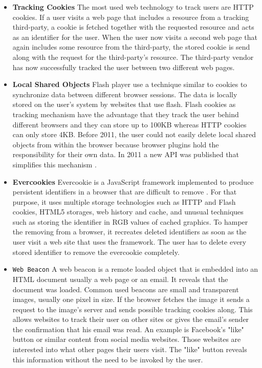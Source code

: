	\begin{itemize}
		\item \textbf{Tracking Cookies} The most used web technology to track users are HTTP cookies. If a user visits a web page that includes a resource from a tracking third-party, a cookie is fetched together with the requested resource and acts as an identifier for the user. When the user now visits a second web page that again includes some resource from the third-party, the stored cookie is send along with the request for the third-party's resource. The third-party vendor has now successfully tracked the user between two different web pages.  
		
		\item \textbf{Local Shared Objects} Flash player use a technique similar to cookies to synchronize data between different browser sessions. The data is locally stored on the user's system by websites that use flash. Flash cookies as tracking mechanism have the advantage that they track the user behind different browsers and they can store up to 100KB whereas HTTP cookies can only store 4KB. Before 2011, the user could not easily delete local shared objects from within the browser because browser plugins hold the responsibility for their own data. In 2011 a new API was published that simplifies this mechanism \cite{mozillaWikiClearPrivacyAPI}. %
		
		\item \textbf{Evercookies} Evercookie is a JavaScript framework implemented to produce persistent identifiers in a browser that are difficult to remove \cite{evercookie}. For that purpose, it uses multiple storage technologies such as HTTP and Flash cookies, HTML5 storages, web history and cache, and unusual techniques such as storing the identifier in RGB values of cached graphics. To hamper the removing from a browser, it recreates deleted identifiers as soon as the user visit a web site that uses the framework. The user has to delete every stored identifier to remove the evercookie completely. 
		
		\item \texttt{Web Beacon} A web beacon is a remote loaded object that is embedded into an HTML document usually a web page or an email. It reveals that the document was loaded. Common used beacons are small and transparent images, usually one pixel in size. If the browser fetches the image it sends a request to the image's server and sends possible tracking cookies along. This allows websites to track their user on other sites or gives the email's sender the confirmation that his email was read. An example is Facebook's "like" button or similar content from social media websites. Those websites are interested into what other pages their users visit. The "like" button reveals this information without the need to be invoked by the user. 
	\end{itemize}
	
